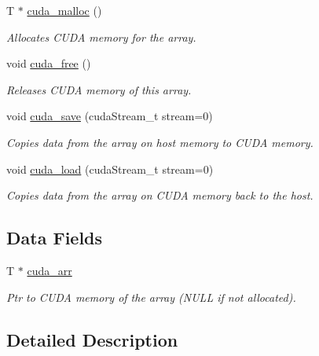 \begin{DoxyCompactItemize}
T $\ast$ \hyperlink{classFVL_1_1CFVArray_ac5b54e1d7aacbc7ac8f947cc8403143e}{cuda\_\-malloc} ()
\begin{DoxyCompactList}\small\item\em Allocates CUDA memory for the array. \item\end{DoxyCompactList}\item 
void \hyperlink{classFVL_1_1CFVArray_a7da37a3af0dbb3b115a980bf13d30d02}{cuda\_\-free} ()
\begin{DoxyCompactList}\small\item\em Releases CUDA memory of this array. \item\end{DoxyCompactList}\item 
void \hyperlink{classFVL_1_1CFVArray_a817cca487c7f644b7e5d1abf8bd42308}{cuda\_\-save} (cudaStream\_\-t stream=0)
\begin{DoxyCompactList}\small\item\em Copies data from the array on host memory to CUDA memory. \item\end{DoxyCompactList}\item 
void \hyperlink{classFVL_1_1CFVArray_a9ea6b5a93cae1474a26ebef38d1eb350}{cuda\_\-load} (cudaStream\_\-t stream=0)
\begin{DoxyCompactList}\small\item\em Copies data from the array on CUDA memory back to the host. \item\end{DoxyCompactList}\end{DoxyCompactItemize}
\subsection*{Data Fields}
\begin{DoxyCompactItemize}
\item 
T $\ast$ \hyperlink{classFVL_1_1CFVArray_ac7c2eda2752dff79215dfcc062d0d814}{cuda\_\-arr}
\begin{DoxyCompactList}\small\item\em Ptr to CUDA memory of the array (NULL if not allocated). \item\end{DoxyCompactList}\end{DoxyCompactItemize}


\subsection{Detailed Description}
